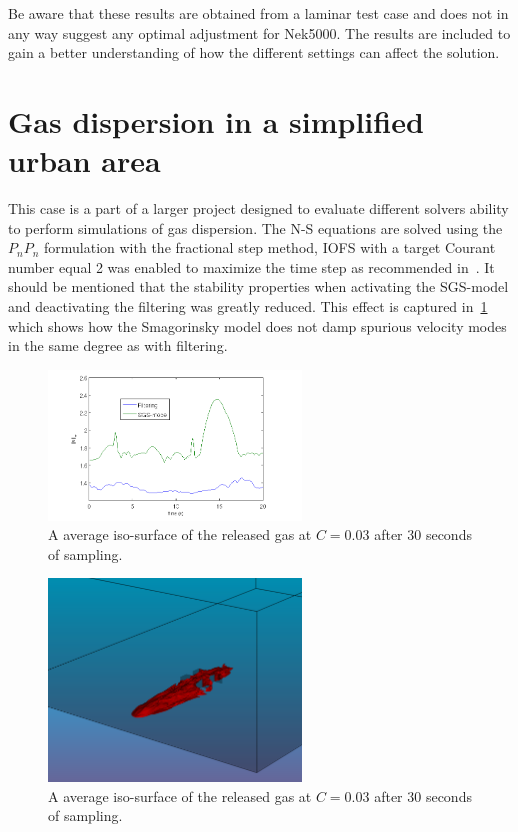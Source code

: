 Be aware that these results are obtained from a laminar test case and does not in any way 
suggest any optimal adjustment for Nek5000. The results are included to gain a better understanding
of how the different settings can affect the solution.

\section{Gas dispersion in a simplified urban area} 
This case is a part of a larger project designed to evaluate different solvers 
ability to perform simulations of gas dispersion. The N-S equations are solved using
the $P_nP_n$ formulation with the fractional step method, IOFS with a target Courant number 
equal 2 was enabled to maximize the time step as recommended in~\cite{Nek}. It should be 
mentioned that the stability properties when activating the SGS-model and deactivating the 
filtering was greatly reduced. This effect is captured in~\ref{fig:maxvel} which shows how 
the Smagorinsky model does not damp spurious velocity modes in the same degree as with filtering. 
%
\begin{figure}[h]
	\centering
	\includegraphics[width=0.6\textwidth]{Figures/maxvel.png}
	\caption{A average iso-surface of the released gas at $C=0.03$ 
    after 30 seconds of sampling.}
	\label{fig:maxvel}
\end{figure}
%
%
\begin{figure}[h]
	\centering
	\includegraphics[width=0.6\textwidth]{Figures/plume.png}
	\caption{A average iso-surface of the released gas at $C=0.03$ 
    after 30 seconds of sampling.}
	\label{fig:plume}
\end{figure}
